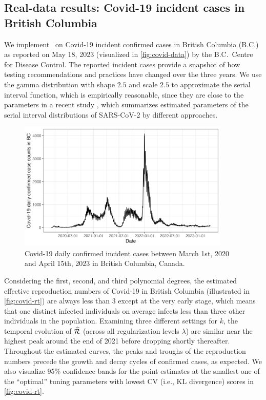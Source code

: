 \subsection{Real-data results: Covid-19 incident cases in British Columbia}

We implement \RtEstim\ on Covid-19 incident confirmed cases in British Columbia
(B.C.) as reported on May 18, 2023 (visualized in \autoref{fig:covid-data}) by
the B.C.\ Centre for Disease Control. The reported incident cases provide a
snapshot of how testing recommendations and practices have changed over the
three years. We use the gamma distribution with shape $2.5$ and scale $2.5$
to approximate the serial interval function, which is empirically
reasonable, since they are close to the parameters in a recent study 
\citep{lehtinen2021relationship}, which summarizes estimated parameters of the 
serial interval distributions of SARS-CoV-2 by different approaches. 

\begin{figure}[tb]
    \centering
    \includegraphics[width=0.9\textwidth]{fig/covid_dat.png}
    \caption{Covid-19 daily confirmed incident cases between March 1st, 
    2020 and April 15th, 2023 in British Columbia, Canada.} 
    \label{fig:covid-data}
\end{figure} 

Considering the first, second, and third polynomial degrees, the estimated 
effective reproduction numbers of Covid-19 in British Columbia
(illustrated in \autoref{fig:covid-rt}) are always less than $3$ except at the 
very early stage, which means that one distinct infected individuals on average 
infects less than three other individuals in the population. 
Examining three different settings for $k$, 
the temporal evolution of $\widehat{\mathcal{R}}$ (across all regularization levels
$\lambda$) are similar near the highest peak around the end of 2021 before
dropping shortly thereafter. Throughout the estimated curves, the peaks and
troughs of the reproduction numbers precede the growth and decay cycles of
confirmed cases, as expected. We also visualize 95\% confidence bands for the
point estimates at the smallest one of the ``optimal'' tuning parameters with 
lowest CV (i.e., KL divergence) scores in \autoref{fig:covid-rt}.     

